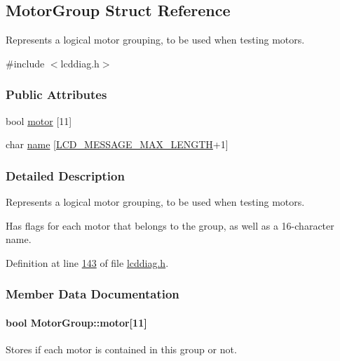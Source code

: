 \hypertarget{struct_motor_group}{}\subsection{Motor\+Group Struct Reference}
\label{struct_motor_group}


Represents a logical motor grouping, to be used when testing motors.  




{\ttfamily \#include $<$lcddiag.\+h$>$}

\subsubsection*{Public Attributes}
\begin{DoxyCompactItemize}
\item 
bool \hyperlink{struct_motor_group_a05d10a69eb1ae279fab13f9a009d84be}{motor} \mbox{[}11\mbox{]}
\item 
char \hyperlink{struct_motor_group_a8f7c6b03cfece909eb0db0b67ce24e6a}{name} \mbox{[}\hyperlink{lcdmsg_8h_abe4c4b70fc6f44ae3680e5b2c68cdd00}{L\+C\+D\+\_\+\+M\+E\+S\+S\+A\+G\+E\+\_\+\+M\+A\+X\+\_\+\+L\+E\+N\+G\+TH}+1\mbox{]}
\end{DoxyCompactItemize}


\subsubsection{Detailed Description}
Represents a logical motor grouping, to be used when testing motors. 

Has flags for each motor that belongs to the group, as well as a 16-\/character name. 

Definition at line \hyperlink{lcddiag_8h_source_l00143}{143} of file \hyperlink{lcddiag_8h_source}{lcddiag.\+h}.



\subsubsection{Member Data Documentation}
\paragraph[{\texorpdfstring{motor}{motor}}]{\setlength{\rightskip}{0pt plus 5cm}bool Motor\+Group\+::motor\mbox{[}11\mbox{]}}\hypertarget{struct_motor_group_a05d10a69eb1ae279fab13f9a009d84be}{}\label{struct_motor_group_a05d10a69eb1ae279fab13f9a009d84be}
Stores if each motor is contained in this group or not.

